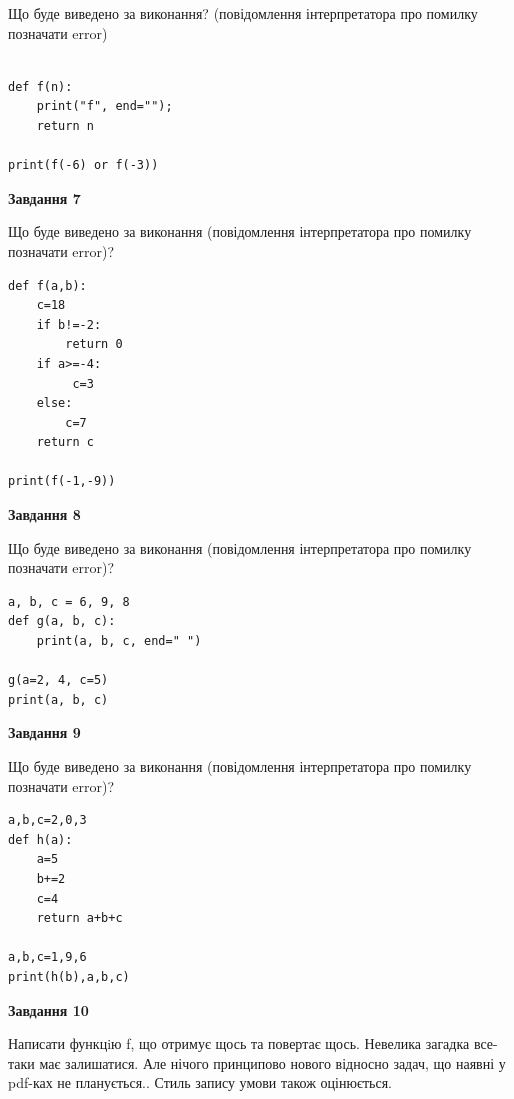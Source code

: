 \documentclass[12pt, ukrainian]{article}
\begin{document}
{\begin {large}
Що буде виведено за виконання? (повідомлення інтерпретатора про помилку позначати error)\par
\begin{verbatim}

def f(n):
    print("f", end="");
    return n

print(f(-6) or f(-3))
\end{verbatim}

{\begin {center}\textbf{Завдання 7}\end {center}}

Що буде виведено за виконання (повідомлення інтерпретатора про помилку позначати error)?\par
\begin{verbatim}
def f(a,b):
    c=18
    if b!=-2:
        return 0
    if a>=-4:
         c=3
    else: 
        c=7
    return c

print(f(-1,-9))
\end{verbatim}

{\begin {center}\textbf{Завдання 8}\end {center}}

Що буде виведено за виконання (повідомлення інтерпретатора про помилку позначати error)?\par
\begin{verbatim}
a, b, c = 6, 9, 8
def g(a, b, c):
    print(a, b, c, end=" ")

g(a=2, 4, c=5)
print(a, b, c)
\end{verbatim}

{\begin {center}\textbf{Завдання 9}\end {center}}

Що буде виведено за виконання (повідомлення інтерпретатора про помилку позначати error)?\par
\begin{verbatim}
a,b,c=2,0,3
def h(a):
    a=5
    b+=2
    c=4
    return a+b+c

a,b,c=1,9,6
print(h(b),a,b,c)
\end{verbatim}

{\begin {center}\textbf{Завдання 10}\end {center}}


Написати функцiю f, що отримує щось та повертає щось. Невелика загадка все-таки має залишатися. Але нічого принципово нового відносно задач, що наявні у pdf-ках не планується.. Стиль запису умови також оцінюється.\par
\end {large}}
\newpage
\end{document}
